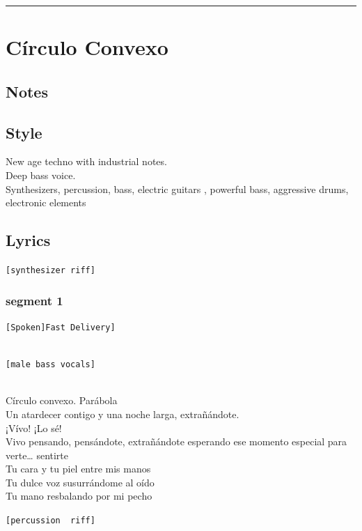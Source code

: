 \begin{center}\rule{0.5\linewidth}{0.5pt}\end{center}

\section{Círculo Convexo}\label{cuxedrculo-convexo}

\subsection{Notes}\label{notes-10}

\subsection{Style}\label{style-9}

New age techno with industrial notes.\\
Deep bass voice.\\
Synthesizers, percussion, bass, electric guitars , powerful bass,
aggressive drums, electronic elements

\subsection{Lyrics}\label{lyrics-9}

\texttt{{[}synthesizer\ riff{]}}

\subsubsection{segment 1}\label{segment-1}

\texttt{{[}Spoken{]}\textasciigrave{}\textasciigrave{}{[}Fast\ Delivery{]}}\strut \\
\texttt{{[}male\ bass\ vocals{]}}\strut \\
Círculo convexo. Parábola\\
Un atardecer contigo y una noche larga, extrañándote.\\
¡Vívo! ¡Lo sé!\\
Vivo pensando, pensándote, extrañándote esperando ese momento especial
para verte\ldots{} sentirte\\
Tu cara y tu piel entre mis manos\\
Tu dulce voz susurrándome al oído\\
Tu mano resbalando por mi pecho

\texttt{{[}percussion\ \ riff{]}}

